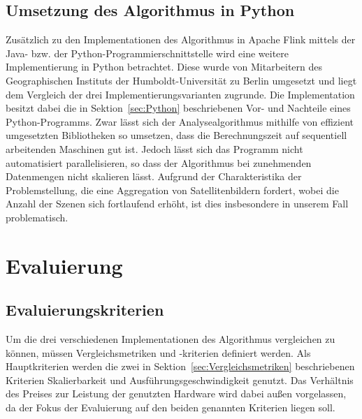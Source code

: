 \section{Umsetzung des Algorithmus in Python}
Zusätzlich zu den Implementationen des Algorithmus in Apache Flink mittels der Java- bzw. der Python-Programmierschnittstelle wird eine weitere Implementierung in Python betrachtet. Diese wurde von Mitarbeitern des Geographischen Instituts der Humboldt-Universität zu Berlin umgesetzt und liegt dem Vergleich der drei Implementierungsvarianten zugrunde. Die Implementation besitzt dabei die in Sektion~\ref{sec:Python} beschriebenen Vor- und Nachteile eines Python-Programms. Zwar lässt sich der Analysealgorithmus mithilfe von effizient umgesetzten Bibliotheken so umsetzen, dass die Berechnungszeit auf sequentiell arbeitenden Maschinen gut ist. Jedoch lässt sich das Programm nicht automatisiert parallelisieren, so dass der Algorithmus bei zunehmenden Datenmengen nicht skalieren lässt. Aufgrund der Charakteristika der Problemstellung, die eine Aggregation von Satellitenbildern fordert, wobei die Anzahl der Szenen sich fortlaufend erhöht, ist dies insbesondere in unserem Fall problematisch.
\newline


\chapter{Evaluierung}
\section{Evaluierungskriterien}
Um die drei verschiedenen Implementationen des Algorithmus vergleichen zu können, müssen Vergleichsmetriken und -kriterien definiert werden. Als Hauptkriterien werden die zwei in Sektion~\ref{sec:Vergleichsmetriken} beschriebenen Kriterien Skalierbarkeit und Ausführungsgeschwindigkeit genutzt. Das Verhältnis des Preises zur Leistung der genutzten Hardware wird dabei außen vorgelassen, da der Fokus der Evaluierung auf den beiden genannten Kriterien liegen soll.

